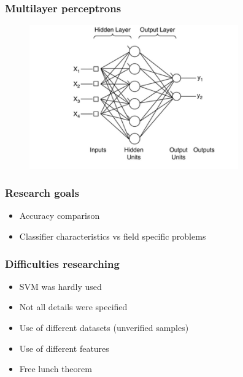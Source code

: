 \documentclass{beamer}
\begin{document}
\begin{frame}
\frametitle{Multilayer perceptrons}

	\begin{figure}
		\centering
    	\includegraphics[width=90mm,scale=1]{./img/MLP.jpg}
	\end{figure}

\end{frame}



\begin{frame}
\frametitle{Research goals}

	\begin{itemize}
		\item Accuracy comparison
		\item Classifier characteristics vs field specific problems
	 \end{itemize}
	 
\end{frame}


\begin{frame}
\frametitle{Difficulties researching}

	\begin{itemize}
		\item SVM was hardly used
		\item Not all details were specified
		\item Use of different datasets (unverified samples)
		\item Use of different features
		\item Free lunch theorem	 
	\end{itemize}

\end{frame}

\end{document}
